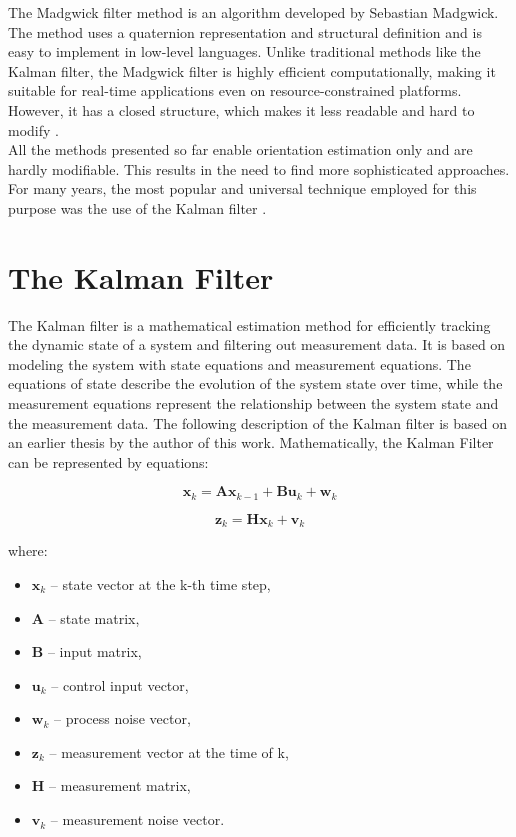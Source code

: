 The Madgwick filter method is an algorithm developed by Sebastian Madgwick. The method uses a quaternion representation and structural definition and is easy to implement in low-level languages. Unlike traditional methods like the Kalman filter, the Madgwick filter is highly efficient computationally, making it suitable for real-time applications even on resource-constrained platforms. However, it has a closed structure, which makes it less readable and hard to modify \cite{madgwick2}.\\

All the methods presented so far enable orientation estimation only and are hardly modifiable. This results in the need to find more sophisticated approaches. For many years, the most popular and universal technique employed for this purpose was the use of the Kalman filter \cite{ekf_poor}.

\section{The Kalman Filter}

The Kalman filter is a mathematical estimation method for efficiently tracking the dynamic state of a system and filtering out measurement data. It is based on modeling the system with state equations and measurement equations. The equations of state describe the evolution of the system state over time, while the measurement equations represent the relationship between the system state and the measurement data.
The following description of the Kalman filter is based on an earlier thesis by the author of this work.
Mathematically, the Kalman Filter can be represented by equations:

\begin{equation}
	\bm{x}_k = \bm{A} \bm{x}_{k-1} + \bm{B} \bm{u}_k + \bm{w}_k
	\label{kf1}
\end{equation}

\begin{equation}
	\bm{z}_k = \bm{H} \bm{x}_k + \bm{v}_k
	\label{kf2}
\end{equation}

where:
\begin{itemize}[noitemsep]
	\item $\bm{x}_k$ -- state vector at the k-th time step,
	\item $\bm{A}$ -- state matrix, 
	\item $\bm{B}$  -- input matrix, 
	\item $\bm{u}_k$  -- control input vector, 
	\item $\bm{w}_k$ -- process noise vector, 
	\item $\bm{z}_k$  -- measurement vector at the time of k, 
	\item $\bm{H}$ -- measurement matrix,
	\item $\bm{v}_k$ -- measurement noise vector.
\end{itemize}

